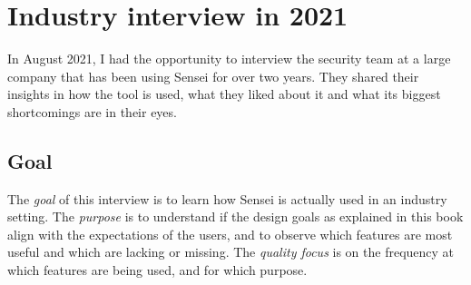 \section{Industry interview in 2021}
\label{sec:trial}

%    
%    
%    
%    

In August 2021, I had the opportunity to interview the security team at a large company that has been using Sensei for over two years.
They shared their insights in how the tool is used, what they liked about it and what its biggest shortcomings are in their eyes. 
        
\subsection{Goal}
The \textit{goal} of this interview is to learn how Sensei is actually used in an industry setting.
The \textit{purpose} is to understand if the design goals as explained in this book align with the expectations of the users, and to observe which features are most useful and which are lacking or missing.
The \textit{quality focus} is on the frequency at which features are being used, and for which purpose.


